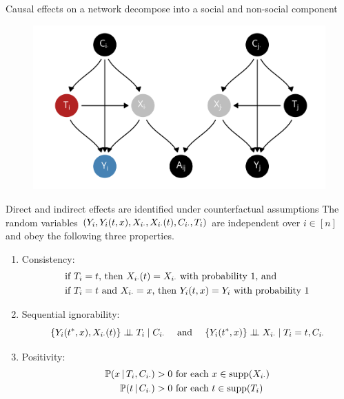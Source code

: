 \documentclass[aspectratio=169]{beamer}
\theoremstyle{remark}
\begin{document}
\begin{frame}{Causal effects on a network decompose into a social and non-social component}
    \begin{figure}
        \centering
        \includegraphics[width=\textwidth]{./figures/dags/homophily-mediating.png}
    \end{figure}
\end{frame}

\begin{frame}{Direct and indirect effects are identified under counterfactual assumptions}
    The random variables $(Y_i, Y_i(t, x), X_{i \cdot}, X_{i \cdot}(t), C_{i \cdot}, T_i)$ are independent over $i \in [n]$ and obey the following three properties.
    \begin{enumerate}
        \item Consistency: \vspace{-3mm}
              \begin{equation*} \begin{aligned}
                       & \text{if $T_i = t$, then $\X_{i \cdot}(t) = \X_{i \cdot}$ with probability 1, and}    \\
                       & \text{if $T_i = t$ and $\X_{i \cdot} = x$, then $Y_i(t, x) = Y_i$ with probability 1}
                      \vspace{-2mm}
                  \end{aligned} \end{equation*}
        \item Sequential ignorability:
              \begin{equation*}
                  \{Y_i(t^*, x), X_{i \cdot}(t)\} \perp \!\!\! \perp T_i \mid C_{i \cdot}
                  ~~~\text{ and }~~~
                  \{Y_i(t^*, x)\} \perp \!\!\! \perp X_{i \cdot}  \mid T_i = t, C_{i \cdot}
              \end{equation*}
        \item Positivity:
              \begin{equation*}
                  \begin{aligned}
                      \P[T_i, C_{i \cdot}]{x} & > 0 \text{ for each }  x \in \supp(\X_{i \cdot}) \\
                      \P[C_{i \cdot}]{t}      & > 0 \text{ for each }  t \in \supp(T_i)
                  \end{aligned}
              \end{equation*}
    \end{enumerate}
\end{frame}
\end{document}
